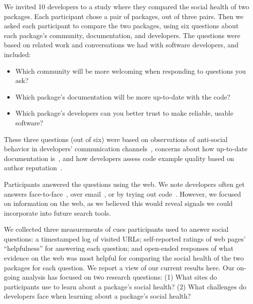 We invited 10 developers to a study where they compared the social health of two packages.
Each participant chose a pair of packages, out of three pairs.
Then we asked each participant to compare the two packages, using six questions about each package's community, documentation, and developers.
The questions were based on related work and conversations we had with software developers, and included:
\begin{itemize}
\setlength{\itemsep}{0pt}
\setlength{\parskip}{0pt}
\setlength{\parsep}{0pt}  
\item Which community will be more welcoming when responding to questions you ask?
\item Which package's documentation will be more up-to-date with the code?
\item Which package's developers can you better trust to make reliable, usable software?
\end{itemize}
These three questions (out of six) were based on observations of anti-social behavior in developers' communication channels~\cite{storey_revolution_2014}, concerns about how up-to-date documentation is~\cite{lethbridge_how_2003,nykaza_what_2002,robillard_field_2011,storey_revolution_2014}, and how developers assess code example quality based on author reputation~\cite{robillard_field_2011}.

Participants answered the questions using the web.
We note developers often get answers face-to-face~\cite{latoza_maintaining_2006,storey_revolution_2014}, over email~\cite{ko_information_2007,latoza_maintaining_2006}, or by trying out code~\cite{brandt_two_2009}.
However, we focused on information on the web, as we believed this would reveal signals we could incorporate into future search tools.

We collected three measurements of cues participants used to answer social questions:
a timestamped log of visited URLs;
self-reported ratings of web pages' ``helpfulness'' for answering each question;
and open-ended responses of what evidence on the web was most helpful for comparing the social health of the two packages for each question.
We report a view of our current results here.
Our on-going analysis has focused on two research questions:
(1) What sites do participants use to learn about a package's social health?
(2) What challenges do developers face when learning about a package's social health?
